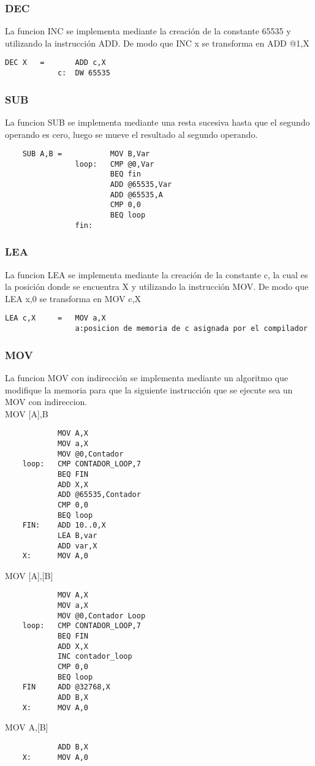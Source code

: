 \documentclass[12pt]{article}
\begin{document}
\subsubsection{DEC}
La funcion INC se implementa mediante la creaci\'on de la constante 65535 y utilizando la instrucci\'on ADD. De modo que INC x se transforma en ADD @1,X
\begin{verbatim}
DEC X   =       ADD c,X
            c:  DW 65535
\end{verbatim} 
\subsubsection{SUB}
La funcion SUB se implementa mediante una resta sucesiva hasta que el segundo operando es cero, luego se mueve el resultado al  segundo operando.
\begin{verbatim}
    SUB A,B =           MOV B,Var 
                loop:   CMP @0,Var 
                        BEQ fin 
                        ADD @65535,Var
                        ADD @65535,A 
                        CMP 0,0
                        BEQ loop
                fin:
\end{verbatim}
\subsubsection{LEA}
La funcion LEA se implementa mediante la creaci\'on de la constante c, la cual es la posici\'on donde se encuentra X y utilizando la instrucci\'on MOV. De modo que LEA x,0 se transforma en MOV c,X
\begin{verbatim}
LEA c,X     =   MOV a,X
                a:posicion de memoria de c asignada por el compilador
\end{verbatim}  
\subsubsection{MOV}
La funcion MOV con indirecci\'on se implementa mediante un algoritmo que modifique la memoria para que la siguiente instrucci\'on que se ejecute sea un MOV con indireccion.\\
 MOV [A],B
\begin{verbatim}
            MOV A,X 
            MOV a,X
            MOV @0,Contador
    loop:   CMP CONTADOR_LOOP,7
            BEQ FIN
            ADD X,X
            ADD @65535,Contador
            CMP 0,0
            BEQ loop
    FIN:    ADD 10..0,X
            LEA B,var
            ADD var,X       
    X:      MOV A,0
\end{verbatim}    
 MOV [A],[B]
\begin{verbatim}
            MOV A,X 
            MOV a,X
            MOV @0,Contador Loop
    loop:   CMP CONTADOR_LOOP,7
            BEQ FIN
            ADD X,X
            INC contador_loop
            CMP 0,0
            BEQ loop
    FIN     ADD @32768,X
            ADD B,X
    X:      MOV A,0
\end{verbatim} 
 MOV A,[B]
\begin{verbatim}
            ADD B,X
    X:      MOV A,0
\end{verbatim}
\end{document}
